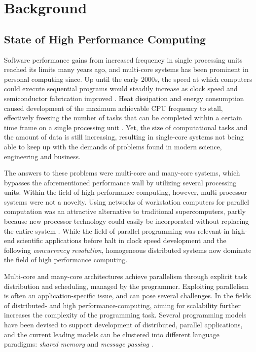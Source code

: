 \documentclass{uit-report}
\begin{document}
\newpage
\section{Background}
%  
\subsection{State of High Performance Computing}
Software performance gains from increased frequency in single processing units reached its limits many years ago, and multi-core systems has been prominent in personal computing since. Up until the early 2000s, the speed at which computers could execute sequential programs would steadily increase as clock speed and semiconductor fabrication improved \cite{sutter_larus_2005}. Heat dissipation and energy consumption caused development of the maximum achievable CPU frequency to stall, effectively freezing the number of tasks that can be completed within a certain time frame on a single processing unit \cite{diaz_munoz-caro_nino_2012}. Yet, the size of computational tasks and the amount of data is still increasing, resulting in single-core systems not being able to keep up with the demands of problems found in modern science, engineering and business. 

The answers to these problems were multi-core and many-core systems, which bypasses the aforementioned performance wall by utilizing several processing units. Within the field of high performance computing, however, multi-processor systems were not a novelty. Using networks of workstation computers for parallel computation was an attractive alternative to traditional supercomputers, partly because new processor technology could easily be incorporated without replacing the entire system \cite{wilkinson_allen_2005}. While the field of parallel programming was relevant in high-end scientific applications before halt in clock speed development and the following \emph{concurrency revolution}, homogeneous distributed systems now dominate the field of high performance computing.

Multi-core and many-core architectures achieve parallelism through explicit task distribution and scheduling, managed by the programmer. Exploiting parallelism is often an application-specific issue, and can pose several challenges. In the fields of distributed- and high performance-computing, aiming for scalability further increases the complexity of the programming task. Several programming models have been devised to support development of distributed, parallel applications, and the current leading models can be clustered into different language paradigms: \emph{shared memory }and \emph{message passing} \cite{pgas_languages}.
\end{document}
